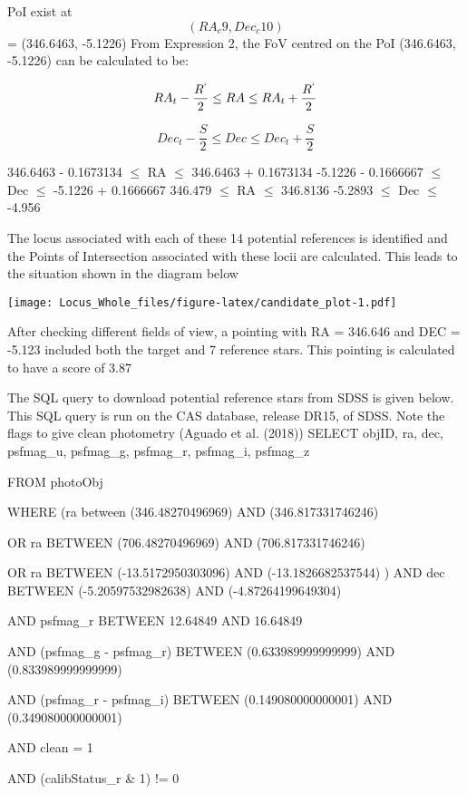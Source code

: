 \documentclass[]{elsarticle} %
\makeatletter
\def\maxwidth{\ifdim\Gin@nat@width>\linewidth\linewidth
\else\Gin@nat@width\fi}
\let\Oldincludegraphics\includegraphics
\renewcommand{\includegraphics}[1]{\Oldincludegraphics[width=\maxwidth]{#1}}
\makeatother
\begin{document}
PoI exist at \[(RA_c9, Dec_c10)\] = (346.6463, -5.1226) \vskip 0.2in
From Expression 2, the FoV centred on the PoI (346.6463, -5.1226) can be
calculated to be:

\[RA_t - {\frac{R^`}{2}} \leq RA \leq RA_t + {\frac{R^`}{2}} \]

\[Dec_t - {\frac{S}{2}} \leq Dec \leq Dec_t + {\frac{S}{2}}\]

346.6463 - 0.1673134 \(\leq\) RA \(\leq\) 346.6463 + 0.1673134
\vskip 0.2in -5.1226 - 0.1666667 \(\leq\) Dec \(\leq\) -5.1226 +
0.1666667 \vskip 0.2in 346.479 \(\leq\) RA \(\leq\) 346.8136
\vskip 0.2in -5.2893 \(\leq\) Dec \(\leq\) -4.956 \newpage

The locus associated with each of these 14 potential references is
identified and the Points of Intersection associated with these locii
are calculated. This leads to the situation shown in the diagram below

\texttt{[image: Locus\_Whole\_files/figure-latex/candidate\_plot-1.pdf]}

After checking different fields of view, a pointing with RA = 346.646
and DEC = -5.123 included both the target and 7 reference stars. This
pointing is calculated to have a score of 3.87 \newpage

The SQL query to download potential reference stars from SDSS is given
below. This SQL query is run on the CAS database, release DR15, of SDSS.
Note the flags to give clean photometry (Aguado et al. (2018))
\vskip 0.2in \noindent SELECT objID, ra, dec, psfmag\_u, psfmag\_g,
psfmag\_r, psfmag\_i, psfmag\_z

FROM photoObj

WHERE (ra between (346.48270496969) AND (346.817331746246)

OR ra BETWEEN (706.48270496969) AND (706.817331746246)

OR ra BETWEEN (-13.5172950303096) AND (-13.1826682537544) ) AND dec
BETWEEN (-5.20597532982638) AND (-4.87264199649304)

AND psfmag\_r BETWEEN 12.64849 AND 16.64849

AND (psfmag\_g - psfmag\_r) BETWEEN (0.633989999999999) AND
(0.833989999999999)

AND (psfmag\_r - psfmag\_i) BETWEEN (0.149080000000001) AND
(0.349080000000001)

AND clean = 1

AND (calibStatus\_r \& 1) != 0 \vskip 0.2in
\end{document}
